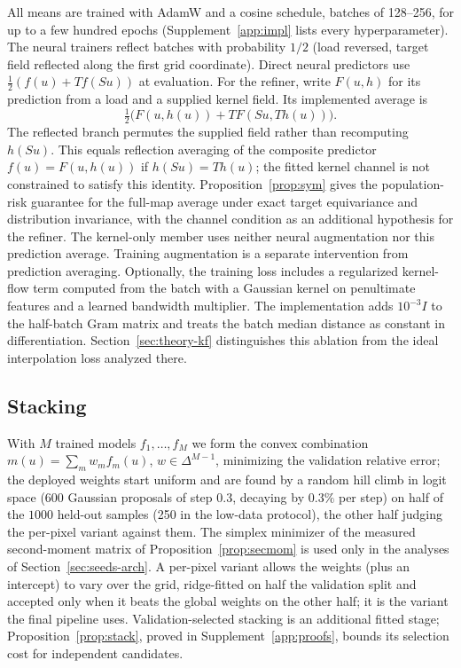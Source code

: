 All means are trained with AdamW and a cosine schedule, batches of 128--256,
for up to a few hundred epochs (Supplement~\ref{app:impl} lists every
hyperparameter).
The neural trainers reflect batches with probability $1/2$ (load reversed,
target field reflected along the first grid coordinate). Direct neural
predictors use $\frac12(f(u)+T f(Su))$ at evaluation. For the refiner, write
$F(u,h)$ for its prediction from a load and a supplied kernel field. Its
implemented average is
\[
\tfrac12\big(F(u,h(u))+T F(Su,T h(u))\big).
\]
The reflected branch permutes the supplied field rather than recomputing
$h(Su)$. This equals reflection averaging of the composite predictor
$f(u)=F(u,h(u))$ if $h(Su)=T h(u)$; the fitted kernel channel is not
constrained to satisfy this identity. Proposition~\ref{prop:sym} gives the population-risk
guarantee for the full-map average under exact target equivariance and
distribution invariance, with the channel condition as an additional
hypothesis for the refiner. The kernel-only member
uses neither neural augmentation nor this prediction average. Training
augmentation is a separate intervention from prediction averaging.
Optionally, the training
loss includes a regularized kernel-flow term computed from the batch
with a Gaussian kernel on penultimate features and a learned bandwidth
multiplier. The implementation adds $10^{-3}I$ to the half-batch Gram matrix
and treats the batch median distance as constant in differentiation.
Section~\ref{sec:theory-kf} distinguishes this ablation from the ideal
interpolation loss analyzed there.

\subsection{Stacking}
With $M$ trained models $f_1,\dots,f_M$ we form the convex combination
$m(u)=\sum_m w_m f_m(u)$, $w\in\Delta^{M-1}$, minimizing the validation
relative error; the deployed weights start uniform and are found by a
random hill climb in logit space ($600$ Gaussian proposals of step $0.3$,
decaying by $0.3\%$ per step) on half of the $1000$ held-out samples (250 in
the low-data protocol), the other half judging the per-pixel variant against
them. The simplex minimizer of the measured second-moment matrix of
Proposition~\ref{prop:secmom} is used only in the analyses of Section~\ref{sec:seeds-arch}. A per-pixel variant allows the weights (plus an intercept) to
vary over the grid, ridge-fitted on half the validation split and accepted
only when it beats the global weights on the other half; it is the variant
the final pipeline uses. Validation-selected stacking \citep{wolpert1992stacked} is an additional fitted stage; Proposition~\ref{prop:stack}, proved in Supplement~\ref{app:proofs}, bounds its selection cost for independent candidates.

